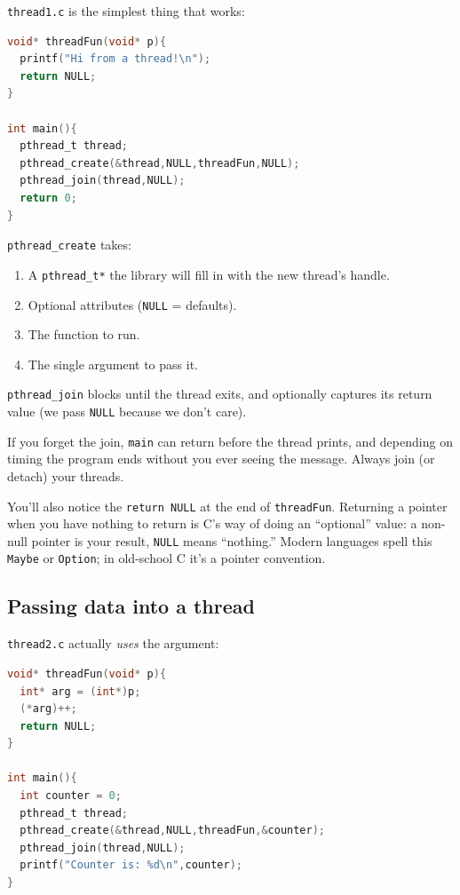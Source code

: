 \documentclass[11pt]{article}
\begin{document}
\texttt{thread1.c} is the simplest thing that works:

\begin{lstlisting}[language=C]
void* threadFun(void* p){
  printf("Hi from a thread!\n");
  return NULL;
}

int main(){
  pthread_t thread;
  pthread_create(&thread,NULL,threadFun,NULL);
  pthread_join(thread,NULL);
  return 0;
}
\end{lstlisting}

\texttt{pthread\_create} takes:
\begin{enumerate}
  \item A \texttt{pthread\_t*} the library will fill in with the new
    thread's handle.
  \item Optional attributes (\texttt{NULL} = defaults).
  \item The function to run.
  \item The single argument to pass it.
\end{enumerate}
\texttt{pthread\_join} blocks until the thread exits, and optionally
captures its return value (we pass \texttt{NULL} because we don't care).

If you forget the join, \texttt{main} can return before the thread
prints, and depending on timing the program ends without you ever
seeing the message. Always join (or detach) your threads.

You'll also notice the \texttt{return NULL} at the end of
\texttt{threadFun}. Returning a pointer when you have nothing to
return is C's way of doing an ``optional'' value: a non-null pointer
is your result, \texttt{NULL} means ``nothing.'' Modern languages
spell this \texttt{Maybe} or \texttt{Option}; in old-school C it's a
pointer convention.

\subsection*{Passing data into a thread}

\texttt{thread2.c} actually \emph{uses} the argument:

\begin{lstlisting}[language=C]
void* threadFun(void* p){
  int* arg = (int*)p;
  (*arg)++;
  return NULL;
}

int main(){
  int counter = 0;
  pthread_t thread;
  pthread_create(&thread,NULL,threadFun,&counter);
  pthread_join(thread,NULL);
  printf("Counter is: %d\n",counter);
}
\end{lstlisting}
\end{document}
